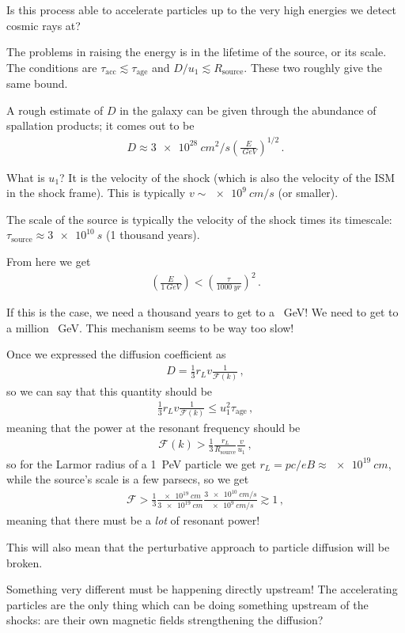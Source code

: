 \documentclass[main.tex]{subfiles}
\begin{document}
Is this process able to accelerate particles up to the very high energies we detect cosmic rays at? 

The problems in raising the energy is in the lifetime of the source, or its scale. 
The conditions are \(\tau _{\text{acc}} \lesssim \tau _{\text{age}}\) and \(D / u_1 \lesssim R _{\text{source}}\). 
These two roughly give the same bound. 

A rough estimate of \(D\) in the galaxy can be given through the abundance of spallation products; it comes out to be 
%
\begin{align}
D \approx \SI{3e28}{cm^2 / s}  \left( \frac{E}{\SI{}{GeV}}\right)^{1/2}
\,.
\end{align}

What is \(u_1 \)? It is the velocity of the shock (which is also the velocity of the ISM in the shock frame). 
This is typically \(v \sim \SI{e9}{cm /s}\) (or smaller). 

The scale of the source is typically the velocity of the shock times its timescale: \(\tau _{\text{source}} \approx \SI{3e10}{s}\) (1 thousand years). 

From here we get 
%
\begin{align}
\left( \frac{E}{\SI{1}{GeV}}\right) < \left( \frac{\tau}{\SI{1000}{yr}}\right)^{2}
\,.
\end{align}

If this is the case, we need a thousand years to get to a \SI{}{GeV}! 
We need to get to a million \SI{}{GeV}. This mechanism seems to be way too slow! 

Once we expressed the diffusion coefficient as 
%
\begin{align}
D = \frac{1}{3} r_L v \frac{1}{\mathscr{F}(k)}
\,,
\end{align}
%
so we can say that this quantity should be 
%
\begin{align}
\frac{1}{3} r_L v \frac{1}{\mathscr{F}(k)} \leq u_1^2 \tau _{\text{age}}
\,,
\end{align}
%
meaning that the power at the resonant frequency should be 
%
\begin{align}
\mathscr{F}(k) > \frac{1}{3} \frac{r_L}{R _{\text{source}}} \frac{v}{u_1 }
\,,
\end{align}
%
so for the Larmor radius of a \SI{1}{PeV} particle we get \(r_L = pc / eB \approx \SI{e19}{cm}\), while the source's scale is a few parsecs, so we get 
%
\begin{align}
\mathscr{F} > \frac{1}{3} \frac{\SI{e19}{cm}}{\SI{3e19}{cm}} \frac{\SI{3e10}{cm/s}}{\SI{e9}{cm/s}} \gtrsim 1
\,,
\end{align}
%
meaning that there must be a \emph{lot} of resonant power! 

This will also mean that the perturbative approach to particle diffusion will be broken.

Something very different must be happening directly upstream! 
The accelerating particles are the only thing which can be doing something upstream of the shocks: are their own magnetic fields strengthening the diffusion?
\end{document}
